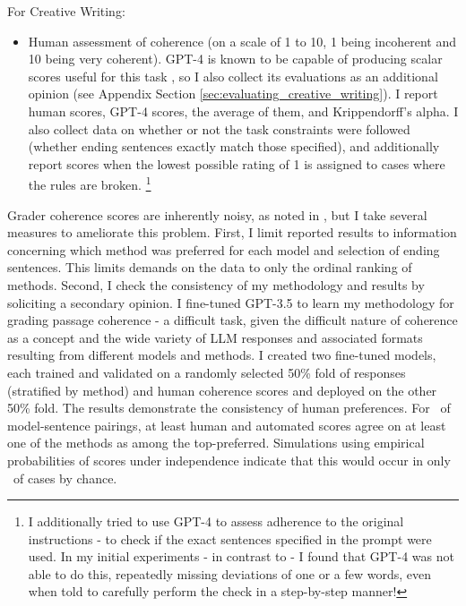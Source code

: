 \documentclass[11pt]{article}
\begin{document}
For Creative Writing:
\begin{itemize}
  \item Human assessment of coherence (on a scale of 1 to 10, 1 being incoherent and 10 being very coherent). GPT-4 is known to be capable of producing scalar scores useful for this task \cite{yao_tree_2023}, so I also collect its evaluations as an additional opinion (see Appendix Section \ref{sec:evaluating_creative_writing}). I report human scores, GPT-4 scores, the average of them, and Krippendorff's alpha. I also collect data on whether or not the task constraints were followed (whether ending sentences exactly match those specified), and additionally report scores when the lowest possible rating of 1 is assigned to cases where the rules are broken. \footnote{I additionally tried to use GPT-4 to assess adherence to the original instructions - to check if the exact sentences specified in the prompt were used. In my initial experiments - in contrast to \citealp{yao_tree_2023} - I found that GPT-4 was not able to do this, repeatedly missing deviations of one or a few words, even when told to carefully perform the check in a step-by-step manner!}
\end{itemize}

%

Grader coherence scores are inherently noisy, as noted in \citealp{yao_tree_2023}, but I take several measures to ameliorate this problem. First, I limit reported results to information concerning which method was preferred for each model and selection of ending sentences. This limits demands on the data to only the ordinal ranking of methods. Second, I check the consistency of my methodology and results by soliciting a secondary opinion. I fine-tuned GPT-3.5 to learn my methodology for grading passage coherence - a difficult task, given the difficult nature of coherence as a concept and the wide variety of LLM responses and associated formats resulting from different models and methods. I created two fine-tuned models, each trained and validated on a randomly selected 50\% fold of responses (stratified by method) and human coherence scores and deployed on the other 50\% fold. The results demonstrate the consistency of human preferences. For \pAtlOneHumanEqAggPct~of model-sentence pairings, at least human and automated scores agree on at least one of the methods as among the top-preferred. Simulations using empirical probabilities of scores under independence indicate that this would occur in only \simProbAgmtCmplStr~of cases by chance.
\end{document}
